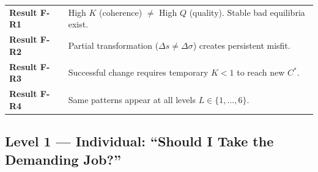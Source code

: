 
\begin{tcolorbox}[colback=orange!5!white, colframe=orange!75!black,
    title=\textbf{Key Results: Universal Patterns}]

\begin{tabular}{@{}p{3cm}p{9cm}@{}}
\textbf{Result F-R1} & High $K$ (coherence) $\neq$ High $Q$ (quality). Stable bad equilibria exist. \\
\textbf{Result F-R2} & Partial transformation ($\Delta s \neq \Delta \sigma$) creates persistent misfit. \\
\textbf{Result F-R3} & Successful change requires temporary $K < 1$ to reach new $C^*$. \\
\textbf{Result F-R4} & Same patterns appear at all levels $L \in \{1,...,6\}$. \\
\end{tabular}

\end{tcolorbox}


\subsection{Level 1 — Individual: ``Should I Take the Demanding Job?''}

